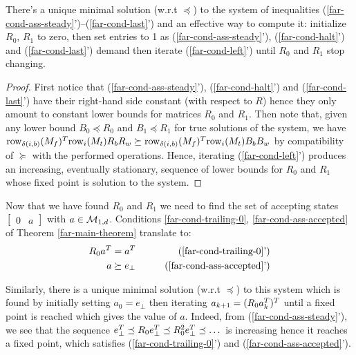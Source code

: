 \begin{lemma}\label{lem:far-unique-min}
    There's a unique minimal solution (w.r.t $\preceq$) to the system  of inequalities (\ref{far-cond-ass-steady}')--(\ref{far-cond-last}') and an effective way to compute it: initialize $R_0$, $R_1$ to zero,
    then set entries to 1 as (\ref{far-cond-ass-steady}'), (\ref{far-cond-halt}') and (\ref{far-cond-last}') demand then iterate (\ref{far-cond-left}') until $R_0$ and $R_1$ stop changing.
\end{lemma}
\begin{proof}

    First notice that (\ref{far-cond-ass-steady}'), (\ref{far-cond-halt}') and (\ref{far-cond-last}') have their right-hand side constant (with respect to $R$) hence they only amount to constant lower bounds for matrices $R_0$ and $R_1$. Then note that, given any lower bound $B_0\preceq R_0$ and $B_1\preceq R_1$ for true solutions of the system, we have  $\text{row}_{\delta(i,b)}(M_f)^T \text{row}_i(M_t)R_b R_w \succeq \text{row}_{\delta(i,b)}(M_f)^T \text{row}_i(M_t)B_b B_w$ by compatibility of $\succeq$ with the performed operations. Hence, iterating (\ref{far-cond-left}') produces an increasing, eventually stationary, sequence of lower bounds for $R_0$ and $R_1$ whose fixed point is solution to the system.
\end{proof}


Now that we have found $R_0$ and $R_1$ we need to find the set of accepting states $\begin{bmatrix}0&a\end{bmatrix}$ with $a \in \mathcal{M}_{1,d}$.
Conditions \eqref{far-cond-trailing-0}, \eqref{far-cond-ass-accepted} of Theorem \ref{far-main-theorem}   translate to:
\begin{align}
    R_0 a\T & = a\T
            &
    \tag{\ref{far-cond-trailing-0}'}
    \\
    a       & \succeq e_{\bot}
            &
    \tag{\ref{far-cond-ass-accepted}'}
\end{align}

Similarly, there is a unique minimal solution (w.r.t $\preceq$) to this system which is found by initially setting $a_0 = e_\bot$ then iterating $a_{k+1} = (R_0 a_{k}^T)^T$ until a fixed point is reached which gives the value of $a$. Indeed, from (\ref{far-cond-ass-steady}'), we see that the sequence $e_\bot^T \preceq  R_0 e_\bot^T\preceq R_0^2 e_\bot^T  \preceq\dots$ is increasing hence it reaches a fixed point, which satisfies (\ref{far-cond-trailing-0}') and (\ref{far-cond-ass-accepted}').

